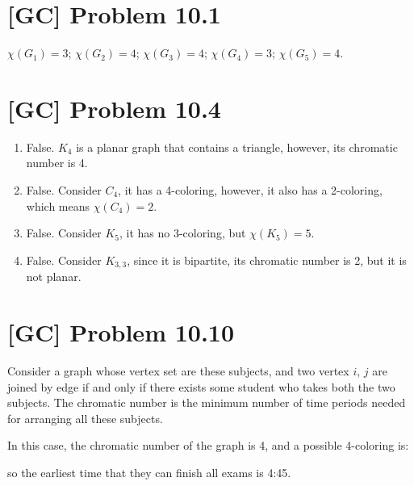 \documentclass[a4paper,11pt,twocolumn]{article}
\begin{document}
  \section{[GC] Problem 10.1}
  $\chi(G_1) = 3$; $\chi(G_2) = 4$; $\chi(G_3) = 4$; $\chi(G_4) = 3$; $\chi(G_5) = 4$.

  \section{[GC] Problem 10.4}
  \begin{enumerate}
    \item False. $K_4$ is a planar graph that contains a triangle, however, its chromatic number is 4.
    \item False. Consider $C_4$, it has a 4-coloring, however, it also has a 2-coloring, which means $\chi(C_4) = 2$.
    \item False. Consider $K_5$, it has no 3-coloring, but $\chi(K_5) = 5$.
    \item False. Consider $K_{3,3}$, since it is bipartite, its chromatic number is 2, but it is not planar.
  \end{enumerate}

  \section{[GC] Problem 10.10}
  Consider a graph whose vertex set are these subjects, and two vertex $i$, $j$ are joined by edge if and only if there exists some student who takes both the two subjects. The chromatic number is the minimum number of time periods needed for arranging all these subjects. \par
  In this case, the chromatic number of the graph is 4, and a possible 4-coloring is:
    \small
    \begin{center}
    \end{center} \par
    \normalsize
    so the earliest time that they can finish all exams is 4:45.
\end{document}

